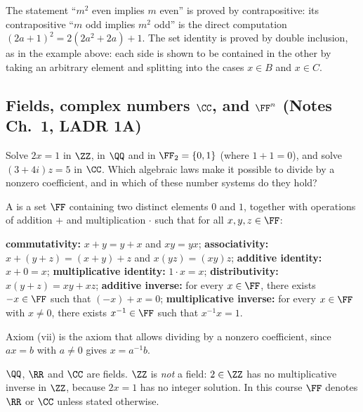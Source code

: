 \documentclass[10pt]{scrartcl}
\begin{document}
\revisit The statement ``$m^2$ even implies $m$ even'' is proved by contrapositive: its contrapositive ``$m$ odd implies $m^2$ odd'' is the direct computation $(2a+1)^2=2(2a^2+2a)+1$. The set identity is proved by double inclusion, as in the example above: each side is shown to be contained in the other by taking an arbitrary element and splitting into the cases $x\in B$ and $x\in C$.

\subsection{Fields, complex numbers $\CC$, and $\FF^n$ (Notes Ch.~1, LADR 1A)}

\begin{qbox}
  Solve $2x=1$ in $\ZZ$, in $\QQ$ and in $\FF_2=\{0,1\}$ (where $1+1=0$), and solve $(3+4i)z=5$ in $\CC$. Which algebraic laws make it possible to divide by a nonzero coefficient, and in which of these number systems do they hold?
\end{qbox}

\begin{definition*}
  A  is a set $\FF$ containing two distinct elements $0$ and $1$, together with operations of addition $+$ and multiplication $\cdot$ such that for all $x,y,z\in\FF$:
  \begin{enumerate}[(i)]
    \ii \textbf{commutativity:} $x+y=y+x$ and $xy=yx$;
    \ii \textbf{associativity:} $x+(y+z)=(x+y)+z$ and $x(yz)=(xy)z$;
    \ii \textbf{additive identity:} $x+0=x$;
    \ii \textbf{multiplicative identity:} $1\cdot x=x$;
    \ii \textbf{distributivity:} $x(y+z)=xy+xz$;
    \ii \textbf{additive inverse:} for every $x\in\FF$, there exists $-x\in\FF$ such that $(-x)+x=0$;
    \ii \textbf{multiplicative inverse:} for every $x\in\FF$ with $x\ne 0$, there exists $x^{-1}\in\FF$ such that $x^{-1}x=1$.
  \end{enumerate}
\end{definition*}

Axiom (vii) is the axiom that allows dividing by a nonzero coefficient, since $ax=b$ with $a\ne0$ gives $x=a^{-1}b$.

\begin{example*}
  $\QQ$, $\RR$ and $\CC$ are fields. $\ZZ$ is \emph{not} a field: $2\in\ZZ$ has no multiplicative inverse in $\ZZ$, because $2x=1$ has no integer solution. In this course $\FF$ denotes $\RR$ or $\CC$ unless stated otherwise.
\end{example*}
\end{document}
